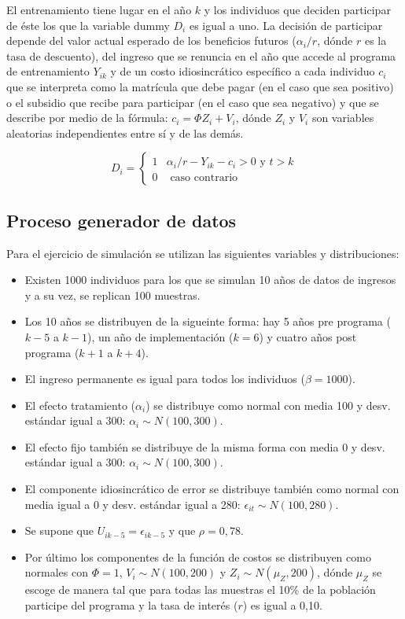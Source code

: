 \documentclass[]{article}
\begin{document}
El entrenamiento tiene lugar en el año $k$ y los individuos que deciden
participar de éste los que la variable dummy $D_{i}$ es igual a uno. La
decisión de participar depende del valor actual esperado de los
beneficios futuros ($\alpha_{i}/r$, dónde $r$ es la tasa de descuento),
del ingreso que se renuncia en el año que accede al programa de
entrenamiento $Y_{ik}$ y de un costo idiosincrático específico a cada
individuo $c_{i}$ que se interpreta como la matrícula que debe pagar (en
el caso que sea positivo) o el subsidio que recibe para participar (en
el caso que sea negativo) y que se describe por medio de la fórmula:
$c_{i}=\Phi Z_{i}+V_{i}$, dónde $Z_{i}$ y $V_{i}$ son variables
aleatorias independientes entre sí y de las demás.

\[ D_{i}=\begin{cases} 1 & \alpha_{i}/r-Y_{ik}-c_{i}>0\text{ y }t>k\\ 0 & \text{ caso contrario}\end{cases} \]

\subsection{Proceso generador de
datos}\label{proceso-generador-de-datos}

Para el ejercicio de simulación se utilizan las siguientes variables y
distribuciones:

\begin{itemize}
\itemsep1pt\parskip0pt
\item
  Existen 1000 individuos para los que se simulan 10 años de datos de
  ingresos y a su vez, se replican 100 muestras.
\item
  Los 10 años se distribuyen de la sigueinte forma: hay 5 años pre
  programa ($k-5$ a $k-1$), un año de implementación ($k=6$) y cuatro
  años post programa ($k+1$ a $k+4$).
\item
  El ingreso permanente es igual para todos los individuos
  ($\beta=1000$).
\item
  El efecto tratamiento ($\alpha_{i}$) se distribuye como normal con
  media 100 y desv. estándar igual a 300: $\alpha_{i}\sim N(100,300)$.
\item
  El efecto fijo también se distribuye de la misma forma con media 0 y
  desv. estándar igual a 300: $\alpha_{i}\sim N(100,300)$.
\item
  El componente idiosincrático de error se distribuye también como
  normal con media igual a 0 y desv. estándar igual a 280:
  $\epsilon_{it}\sim N(100,280)$.
\item
  Se supone que $U_{ik-5}=\epsilon_{ik-5}$ y que $\rho=0,78$.
\item
  Por último los componentes de la función de costos se distribuyen como
  normales con $\Phi=1$, $V_{i}\sim N(100,200)$ y
  $Z_{i}\sim N(\mu_{Z},200)$, dónde $\mu_{Z}$ se escoge de manera tal
  que para todas las muestras el 10\% de la población participe del
  programa y la tasa de interés ($r$) es igual a 0,10.
\end{itemize}
\end{document}
